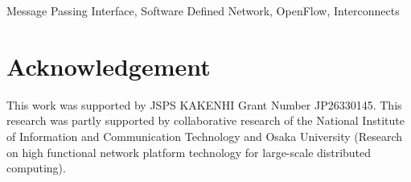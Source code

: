 \documentclass[10pt, a4paper]{IEEEtran}
\begin{document}
\begin{IEEEkeywords}
    Message Passing Interface, Software Defined Network, OpenFlow, Interconnects
\end{IEEEkeywords}








\section*{Acknowledgement}
This work was supported by JSPS KAKENHI Grant Number JP26330145. This research
was partly supported by collaborative research of the National Institute of
Information and Communication Technology and Osaka University (Research on
high functional network platform technology for large-scale distributed
computing).


\printbibliography[heading=bibintoc,title={References}]

\par\leavevmode
\end{document}
